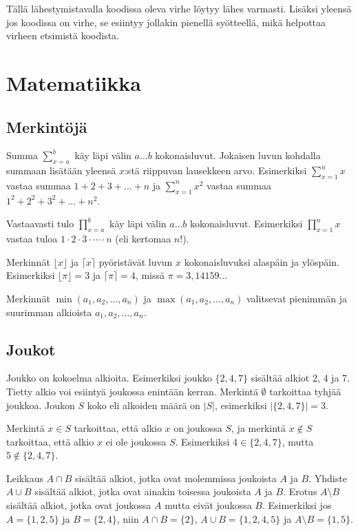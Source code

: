 Tällä lähestymistavalla
koodissa oleva virhe löytyy
lähes varmasti.
Lisäksi yleensä jos koodissa on virhe,
se esiintyy jollakin pienellä syötteellä,
mikä helpottaa virheen etsimistä koodista.

\section{Matematiikka}

\subsection{Merkintöjä}

Summa $\sum_{x=a}^b$ käy läpi välin $a \ldots b$ kokonaisluvut.
Jokaisen luvun kohdalla summaan lisätään
yleensä $x$:stä riippuvan lausekkeen arvo.
Esimerkiksi $\sum_{x=1}^n x$
vastaa summaa $1+2+3+\ldots+n$
ja $\sum_{x=1}^n x^2$
vastaa summaa $1^2+2^2+3^2+\ldots+n^2$.

Vastaavasti tulo $\prod_{x=a}^b$
käy läpi välin $a \ldots b$ kokonaisluvut.
Esimerkiksi $\prod_{x=1}^n x$ vastaa tuloa
$1 \cdot 2 \cdot 3 \cdot \cdots \cdot n$ (eli kertomaa $n!$).

Merkinnät $\lfloor x \rfloor$ ja $\lceil x \rceil$
pyöristävät luvun $x$ kokonaisluvuksi alaspäin ja ylöspäin.
Esimerkiksi $\lfloor \pi \rfloor = 3$ ja $\lceil \pi \rceil = 4$,
missä $\pi = 3{,}14159\ldots$

Merkinnät $\min(a_1,a_2,\ldots,a_n)$ ja
$\max(a_1,a_2,\ldots,a_n)$ valitsevat
pienimmän ja suurimman alkioista
$a_1,a_2,\ldots,a_n$.

\subsection{Joukot}

Joukko on kokoelma alkioita.
Esimerkiksi joukko $\{2,4,7\}$
sisältää alkiot 2, 4 ja 7.
Tietty alkio voi esiintyä joukossa enintään kerran.
Merkintä $\emptyset$ tarkoittaa tyhjää joukkoa.
Joukon $S$ koko eli alkoiden määrä on $|S|$,
esimerkiksi $|\{2,4,7\}|=3$.

Merkintä $x \in S$ tarkoittaa,
että alkio $x$ on joukossa $S$,
ja merkintä $x \notin S$ tarkoittaa,
että alkio $x$ ei ole joukossa $S$.
Esimerkiksi $4 \in \{2,4,7\}$,
mutta $5 \notin \{2,4,7\}$.

Leikkaus $A \cap B$ sisältää alkiot,
jotka ovat molemmissa joukoista $A$ ja $B$.
Yhdiste $A \cup B$ sisältää alkiot,
jotka ovat ainakin toisessa joukoista $A$ ja $B$.
Erotus $A \setminus B$ sisältää alkiot,
jotka ovat joukossa $A$ mutta eivät joukossa $B$.
Esimerkiksi jos $A=\{1,2,5\}$ ja $B=\{2,4\}$,
niin $A \cap B = \{2\}$, $A \cup B = \{1,2,4,5\}$
ja $A \setminus B = \{1,5\}$.

